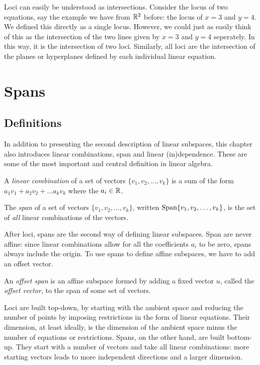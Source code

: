 \documentclass[fleqn]{report}
\begin{document}
\begin{example}
Loci can easily be understood as intersections. Consider the 
locus of two equations, say the example we have from $\mathbb{R}^2$
before: the locus of $x=3$ and $y=4$. We defined this directly
as a single locus. However, we could just as easily think of
this as the intersection of the two lines given by $x=3$ and
$y=4$ seperately. In this way, it is the intersection of two
loci. Similarly, all loci are the intersection of the planes or 
hyperplanes defined by each individual linear equation.
\end{example}

\chapter{Spans}

\section{Definitions}

In addition to presenting the second description of linear
subspaces, this chapter also introduces linear combinations,
span and linear (in)dependence. These are some of the most
important and central definition in linear algebra.

\begin{defn}
A \emph{linear combination} of a set of vectors $\{v_1, v_2, \ldots,
v_k\}$ is a sum of the form $a_1 v_1 + a_2 v_2 + \ldots a_k
v_k$ where the $a_i \in \mathbb{R}$. 
\end{defn}

\begin{defn}
The \emph{span} of a set of vectors $\{v_1, v_2, \ldots, v_k\}$,
written $\mathrm{Span} \{v_1, v_2, \ldots, v_k\}$, is the set of
\emph{all} linear combinations of the vectors.
\end{defn}

After loci, spans are the second way of defining linear
subspaces. Span are never affine: since linear combinations
allow for all the coefficients $a_i$ to be zero, spans always
include the origin. To use spans to define affine subspaces,
we have to add an offset vector.

\begin{defn}
An \emph{offset span} is an affine subspace formed by adding a
fixed vector $u$, called the \emph{offset vector}, to the
span of some set of vectors.
\end{defn}

Loci are built top-down, by starting with the ambient space
and reducing the number of points by imposing restrictions in the
form of linear equations. Their dimension, at least ideally, is
the dimension of the ambient space minus the number of equations
or restrictions. Spans, on the other hand, are built bottom-up.
They start with a number of vectors and take all linear
combinations: more starting vectors leads to more independent
directions and a larger dimension.
\end{document}
